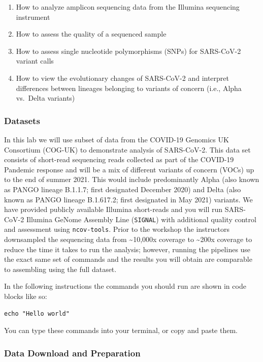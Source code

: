 \documentclass[
]{book}
\providecommand{\tightlist}{%
  \setlength{\itemsep}{0pt}\setlength{\parskip}{0pt}}
\begin{document}
\begin{enumerate}
\def\labelenumi{\arabic{enumi}.}
\tightlist
\item
  How to analyze amplicon sequencing data from the Illumina sequencing instrument
\item
  How to assess the quality of a sequenced sample
\item
  How to assess single nucleotide polymorphisms (SNPs) for SARS-CoV-2 variant calls
\item
  How to view the evolutionary changes of SARS-CoV-2 and interpret differences between lineages belonging to variants of concern (i.e., Alpha vs.~Delta variants)
\end{enumerate}

\subsubsection{Datasets}\label{datasets}

In this lab we will use subset of data from the COVID-19 Genomics UK Consortium (COG-UK) to demonstrate analysis of SARS-CoV-2. This data set consists of short-read sequencing reads collected as part of the COVID-19 Pandemic response and will be a mix of different variants of concern (VOCs) up to the end of summer 2021. This would include predominantly Alpha (also known as PANGO lineage B.1.1.7; first designated December 2020) and Delta (also known as PANGO lineage B.1.617.2; first designated in May 2021) variants. We have provided publicly available Illumina short-reads and you will run SARS-CoV-2 Illumina GeNome Assembly Line (\texttt{SIGNAL}) with additional quality control and assessment using \texttt{ncov-tools}. Prior to the workshop the instructors downsampled the sequencing data from \textasciitilde10,000x coverage to \textasciitilde200x coverage to reduce the time it takes to run the analysis; however, running the pipelines use the exact same set of commands and the results you will obtain are comparable to assembling using the full dataset.

In the following instructions the commands you should run are shown in code blocks like so:

\begin{verbatim}
echo "Hello world"
\end{verbatim}

You can type these commands into your terminal, or copy and paste them.

\subsubsection{Data Download and Preparation}\label{data-download-and-preparation}
\end{document}

